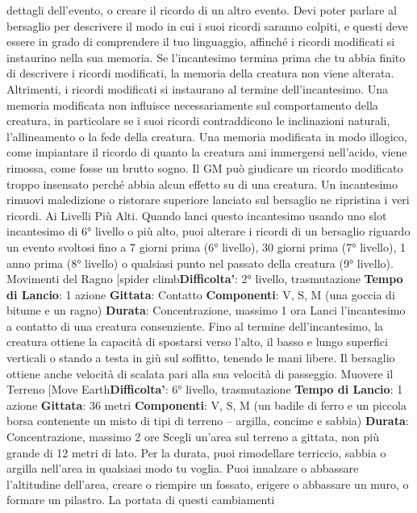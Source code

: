 \begin{multicols}{2}
dettagli dell’evento, o creare il ricordo di un altro evento.
Devi poter parlare al bersaglio per descrivere il modo in
cui i suoi ricordi saranno colpiti, e questi deve essere in
grado di comprendere il tuo linguaggio, affinché i ricordi
modificati si instaurino nella sua memoria. Se
l’incantesimo termina prima che tu abbia finito di
descrivere i ricordi modificati, la memoria della creatura
non viene alterata. Altrimenti, i ricordi modificati si
instaurano al termine dell’incantesimo.
Una memoria modificata non influisce necessariamente
sul comportamento della creatura, in particolare se i
suoi ricordi contraddicono le inclinazioni naturali,
l’allineamento o la fede della creatura. Una memoria
modificata in modo illogico, come impiantare il ricordo di
quanto la creatura ami immergersi nell’acido, viene
rimossa, come fosse un brutto sogno. Il GM può
giudicare un ricordo modificato troppo insensato perché
abbia alcun effetto su di una creatura.
Un incantesimo rimuovi maledizione o ristorare
superiore lanciato sul bersaglio ne ripristina i veri
ricordi.
Ai Livelli Più Alti. Quando lanci questo incantesimo
usando uno slot incantesimo di 6° livello o più alto, puoi
alterare i ricordi di un bersaglio riguardo un evento
svoltosi fino a 7 giorni prima (6° livello), 30 giorni prima
(7° livello), 1 anno prima (8° livello) o qualsiasi punto
nel passato della creatura (9° livello).
Movimenti del Ragno
[spider climb\textbf{Difficolta'}:
2° livello, trasmutazione
\textbf{Tempo di Lancio}: 1 azione
\textbf{Gittata}: Contatto
\textbf{Componenti}: V, S, M (una goccia di bitume e un
ragno)
\textbf{Durata}: Concentrazione, massimo 1 ora
Lanci l’incantesimo a contatto di una creatura
consenziente. Fino al termine dell’incantesimo, la
creatura ottiene la capacità di spostarsi verso l’alto, il
basso e lungo superfici verticali o stando a testa in giù
sul soffitto, tenendo le mani libere. Il bersaglio ottiene
anche velocità di scalata pari alla sua velocità di
passeggio.
Muovere il Terreno
[Move Earth\textbf{Difficolta'}:
6° livello, trasmutazione
\textbf{Tempo di Lancio}: 1 azione
\textbf{Gittata}: 36 metri
\textbf{Componenti}: V, S, M (un badile di ferro e un piccola
borsa contenente un misto di tipi di terreno – argilla,
concime e sabbia)
\textbf{Durata}: Concentrazione, massimo 2 ore
Scegli un’area sul terreno a gittata, non più grande di
12 metri di lato. Per la durata, puoi rimodellare terriccio,
sabbia o argilla nell’area in qualsiasi modo tu voglia.
Puoi innalzare o abbassare l’altitudine dell’area, creare
o riempire un fossato, erigere o abbassare un muro, o
formare un pilastro. La portata di questi cambiamenti

\end{multicols}

